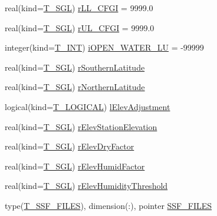 \begin{DoxyCompactItemize}
\item 
real(kind=\hyperlink{namespacetypes_af3012489af4c138f271f1bce244b7e51}{T\_\-SGL}) \hyperlink{typetypes_1_1_t___m_o_d_e_l___c_o_n_f_i_g_u_r_a_t_i_o_n_a9345c2651d5f2bf5e4bd953cc1fb0a19}{rLL\_\-CFGI} = 9999.0
\item 
real(kind=\hyperlink{namespacetypes_af3012489af4c138f271f1bce244b7e51}{T\_\-SGL}) \hyperlink{typetypes_1_1_t___m_o_d_e_l___c_o_n_f_i_g_u_r_a_t_i_o_n_a071252bacb3e362f45b538f75ab1cf82}{rUL\_\-CFGI} = 9999.0
\item 
integer(kind=\hyperlink{namespacetypes_a4e4d040a4425196c4d43be63e7e6103a}{T\_\-INT}) \hyperlink{typetypes_1_1_t___m_o_d_e_l___c_o_n_f_i_g_u_r_a_t_i_o_n_a41211037efdb530bae08c874407efb84}{iOPEN\_\-WATER\_\-LU} = -\/99999
\item 
real(kind=\hyperlink{namespacetypes_af3012489af4c138f271f1bce244b7e51}{T\_\-SGL}) \hyperlink{typetypes_1_1_t___m_o_d_e_l___c_o_n_f_i_g_u_r_a_t_i_o_n_a9a5b7950f0586c3b1cd97d7fd34a8adb}{rSouthernLatitude}
\item 
real(kind=\hyperlink{namespacetypes_af3012489af4c138f271f1bce244b7e51}{T\_\-SGL}) \hyperlink{typetypes_1_1_t___m_o_d_e_l___c_o_n_f_i_g_u_r_a_t_i_o_n_ae444174001e9bcab2e1e7b90823f7c03}{rNorthernLatitude}
\item 
logical(kind=\hyperlink{namespacetypes_adfa8f4f6096bb7bdbb93f36b911dcaad}{T\_\-LOGICAL}) \hyperlink{typetypes_1_1_t___m_o_d_e_l___c_o_n_f_i_g_u_r_a_t_i_o_n_ae295b00bee178bd2c6265333c134f76c}{lElevAdjustment}
\item 
real(kind=\hyperlink{namespacetypes_af3012489af4c138f271f1bce244b7e51}{T\_\-SGL}) \hyperlink{typetypes_1_1_t___m_o_d_e_l___c_o_n_f_i_g_u_r_a_t_i_o_n_ac312f92f94aef8a023f2d9c1ddd79392}{rElevStationElevation}
\item 
real(kind=\hyperlink{namespacetypes_af3012489af4c138f271f1bce244b7e51}{T\_\-SGL}) \hyperlink{typetypes_1_1_t___m_o_d_e_l___c_o_n_f_i_g_u_r_a_t_i_o_n_ac93c46ae336e46cbfbdfddb8a0706124}{rElevDryFactor}
\item 
real(kind=\hyperlink{namespacetypes_af3012489af4c138f271f1bce244b7e51}{T\_\-SGL}) \hyperlink{typetypes_1_1_t___m_o_d_e_l___c_o_n_f_i_g_u_r_a_t_i_o_n_adbf1f733ef0b7de03bd76eff716d15f8}{rElevHumidFactor}
\item 
real(kind=\hyperlink{namespacetypes_af3012489af4c138f271f1bce244b7e51}{T\_\-SGL}) \hyperlink{typetypes_1_1_t___m_o_d_e_l___c_o_n_f_i_g_u_r_a_t_i_o_n_a006aa06621dec94e7614c63f5c852815}{rElevHumidityThreshold}
\item 
type(\hyperlink{typetypes_1_1_t___s_s_f___f_i_l_e_s}{T\_\-SSF\_\-FILES}), dimension(:), pointer \hyperlink{typetypes_1_1_t___m_o_d_e_l___c_o_n_f_i_g_u_r_a_t_i_o_n_a0a93cd1ea020beb57bae92e6c38c0d2a}{SSF\_\-FILES}

\end{DoxyCompactItemize}
